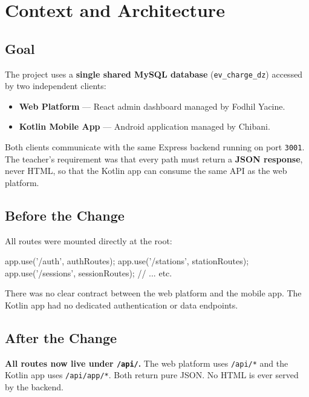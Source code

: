 \documentclass[12pt,a4paper]{report}
\begin{document}
\chapter{Context and Architecture}

\section{Goal}

The project uses a \textbf{single shared MySQL database} (\texttt{ev\_charge\_dz}) accessed by two independent clients:

\begin{itemize}
  \item \textbf{Web Platform} — React admin dashboard managed by Fodhil Yacine.
  \item \textbf{Kotlin Mobile App} — Android application managed by Chibani.
\end{itemize}

Both clients communicate with the same Express backend running on port \texttt{3001}.
The teacher's requirement was that every path must return a \textbf{JSON response}, never HTML,
so that the Kotlin app can consume the same API as the web platform.

\section{Before the Change}

All routes were mounted directly at the root:

\begin{codebox}
app.use('/auth',     authRoutes);
app.use('/stations', stationRoutes);
app.use('/sessions', sessionRoutes);
// ... etc.
\end{codebox}

There was no clear contract between the web platform and the mobile app.
The Kotlin app had no dedicated authentication or data endpoints.

\section{After the Change}

\begin{tcolorbox}[colback=lightblue, colframe=midblue, arc=4pt]
\textbf{All routes now live under \texttt{/api/}.}
The web platform uses \texttt{/api/*} and the Kotlin app uses \texttt{/api/app/*}.
Both return pure JSON. No HTML is ever served by the backend.
\end{tcolorbox}
\end{document}
